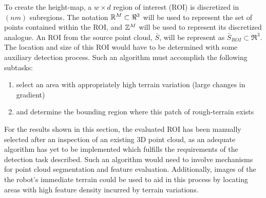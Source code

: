 			To create the height-map, a $w\times d$ region of interest (ROI) is discretized in $(nm)$ subregions. The notation ${\Bbb R}^{M}\subset \Re^{3}$ will be used to represent the set of points contained within the ROI, and ${\Bbb Z}^{M}$ will be used to represent its discretized analogue. An ROI from the source point cloud, $\bar{S}$, will be represent as $\bar{S}_{ROI}\subset\Re^{3}$. The location and size of this ROI would have to be determined with some auxiliary detection process. Such an algorithm must accomplish the following subtasks:
			\begin{enumerate}
				\item select an area with appropriately high terrain variation (large changes in gradient)
				\item and determine the bounding region where this patch of rough-terrain exists
			\end{enumerate}
			For the results shown in this section, the evaluated ROI has been manually selected after an inspection of an existing 3D point cloud, as an adequate algorithm has yet to be implemented which fulfills the requirements of the detection task described. Such an algorithm would need to involve mechanisms for point cloud segmentation and feature evaluation. Additionally, images of the the robot's immediate terrain could be used to aid in this process by locating areas with high feature density incurred by terrain variations.

